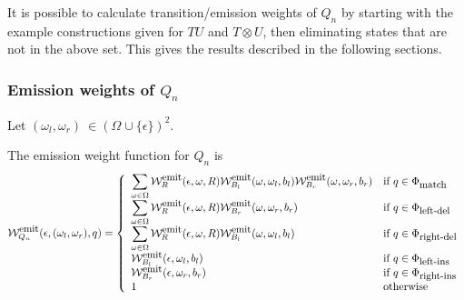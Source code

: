 \documentclass{article}
\newcommand\gappedalphabet[1]{(\Omega_{#1} \cup \{\epsilon\})}
\newcommand\gapsquared{\gappedalphabet{}^2}
\newcommand\compose{}
\newcommand\fork{\otimes}
\newcommand\States{\Phi}
\newcommand\statesof[1]{\States_{#1}}
\newcommand\weight{{\cal W}}
\newcommand\weightfunof[1]{\weight_{#1}}
\newcommand\emitweightfun[1]{\weightfunof{#1}^{\mbox{\small emit}}}
\newcommand\stateset[1]{\statesof{\mbox{\small #1}}}
\newcommand\matchsuffix{match}
\newcommand\leftinsertsuffix{left-ins}
\newcommand\rightinsertsuffix{right-ins}
\newcommand\leftdeletesuffix{left-del}
\newcommand\rightdeletesuffix{right-del}
\newcommand\matchstates{\stateset{\matchsuffix}}
\newcommand\leftinsertstates{\stateset{\leftinsertsuffix}}
\newcommand\rightinsertstates{\stateset{\rightinsertsuffix}}
\newcommand\leftdeletestates{\stateset{\leftdeletesuffix}}
\newcommand\rightdeletestates{\stateset{\rightdeletesuffix}}
\begin{document}
It is possible to calculate transition/emission weights of $Q_n$
by starting with the example constructions given for $T \compose U$ and $T \fork U$,
then eliminating states that are not in the above set.
This gives the results described in the following sections.

\subsubsection{Emission weights of $Q_n$}

Let $(\omega_l,\omega_r)\ \in \gapsquared$.

The emission weight function for $Q_n$ is
\[
\emitweightfun{Q_n}(\epsilon,(\omega_l,\omega_r),q) = \left\{
\begin{array}{ll}
\displaystyle
\sum_{\omega \in \Omega} \emitweightfun{R}(\epsilon,\omega,R)
 \emitweightfun{B_l}(\omega,\omega_l,b_l)
 \emitweightfun{B_r}(\omega,\omega_r,b_r)
 & \mbox{if $q \in \matchstates$} \\
\displaystyle
\sum_{\omega \in \Omega} \emitweightfun{R}(\epsilon,\omega,R)
 \emitweightfun{B_r}(\omega,\omega_r,b_r)
 & \mbox{if $q \in \leftdeletestates$} \\
\displaystyle
\sum_{\omega \in \Omega} \emitweightfun{R}(\epsilon,\omega,R)
 \emitweightfun{B_l}(\omega,\omega_l,b_l)
 & \mbox{if $q \in \rightdeletestates$} \\
 \emitweightfun{B_l}(\epsilon,\omega_l,b_l)
 & \mbox{if $q \in \leftinsertstates$} \\
 \emitweightfun{B_r}(\epsilon,\omega_r,b_r)
 & \mbox{if $q \in \rightinsertstates$} \\
1
 & \mbox{otherwise}
\end{array}
\right.
\]
\end{document}
